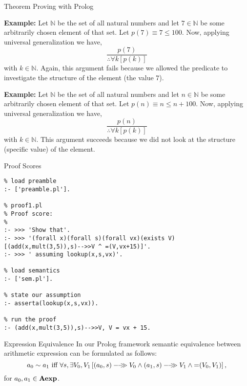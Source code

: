 \documentclass{beamer}
\begin{document}
\begin{frame}[fragile]{Theorem Proving with Prolog}

\scriptsize

{\bf Example:} Let $\mathbb{N}$ be the set of all natural numbers and let $7\in\mathbb{N}$ be some arbitrarily chosen
element of that set.  Let $p(7)\equiv 7 \le 100$.  Now, applying universal generalization we have, 
\[
\frac{p(7)}{\therefore \forall k[p(k)]}
\]
with $k\in\mathbb{N}$.  Again, this argument fails because we allowed the predicate to investigate the structure of
the element (the value $7$).

\vspace{.3in}
{\bf Example:} Let $\mathbb{N}$ be the set of all natural numbers and let $n\in\mathbb{N}$ be some arbitrarily chosen
element of that set.  Let $p(n)\equiv n \le n+100$.  Now, applying universal generalization we have, 
\[
\frac{p(n)}{\therefore \forall k[p(k)]}
\]
with $k\in\mathbb{N}$.  This argument succeeds because we did not look at the structure (specific value) of the element.

\end{frame}





\begin{frame}[fragile]{\large Proof Scores}
\tiny
\begin{verbatim}
% load preamble
:- ['preamble.pl'].

% proof1.pl
% Proof score:
%
:- >>> 'Show that'.
:- >>> '(forall x)(forall s)(forall vx)(exists V)[(add(x,mult(3,5)),s)-->>V ^ =(V,vx+15)]'.
:- >>> ' assuming lookup(x,s,vx)'.

% load semantics
:- ['sem.pl'].

% state our assumption
:- asserta(lookup(x,s,vx)).                                                                 
                                                                                            
% run the proof                                                                             
:- (add(x,mult(3,5)),s)-->>V, V = vx + 15.
\end{verbatim}
\end{frame}

\begin{frame}{Expression Equivalence}
\small
In our Prolog framework semantic equivalence between arithmetic expression
can be formulated as follows:
\[
a_0 \sim a_1 \mbox{ iff } \forall s,\exists V_0,V_1\left[ \sem{(a_0,s)}{V_0}\wedge \sem{(a_1,s)}{V_1} \wedge \mbox{=}(V_0,V_1) \right ],
\]
for $a_0, a_1 \in \mbox{\bf Aexp}$.

\end{frame}
\end{document}
